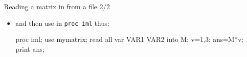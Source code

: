 \documentclass[unknownkeysallowed]{beamer}\usepackage[]{graphicx}\usepackage[]{color}
\begin{document}
\begin{frame}[fragile]{Reading a matrix in from a file 2/2}
  
  \begin{itemize}
  \item and then use in \texttt{proc iml} thus:
    
    \begin{Sascode}[store=imf]
proc iml;
  use mymatrix;
  read all var {VAR1 VAR2} into M;
  v={1,3};
  ans=M*v;
  print ans;
    \end{Sascode}
    
    
  \end{itemize}
  
\end{frame}

\end{document}
